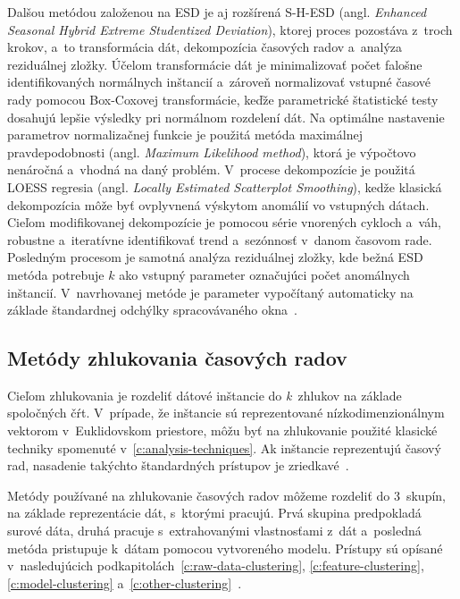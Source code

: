 \documentclass[a4paper,twoside,slovak,12pt,appendix]{article}
\begin{document}
\noindent
Dalšou metódou založenou na ESD je aj rozšírená S-H-ESD (angl. \textit{Enhanced
Seasonal Hybrid Extreme Studentized Deviation}), ktorej proces pozostáva z~troch
krokov, a~to transformácia dát, dekompozícia časových radov a~analýza
reziduálnej zložky. Účelom transformácie dát je minimalizovať počet falošne
identifikovaných normálnych inštancií a~zároveň normalizovať vstupné časové
rady pomocou Box-Coxovej transformácie, keďže parametrické štatistické testy
dosahujú lepšie výsledky pri normálnom rozdelení dát. Na optimálne nastavenie
parametrov normalizačnej funkcie je použitá metóda maximálnej pravdepodobnosti
(angl. \textit{Maximum Likelihood method}), ktorá je výpočtovo nenáročná
a~vhodná na daný problém. V~procese dekompozície je použitá LOESS regresia
(angl. \textit{Locally Estimated Scatterplot Smoothing}), kedže klasická
dekompozícia môže byť ovplyvnená výskytom anomálií vo vstupných dátach.
Cieľom modifikovanej dekompozície je pomocou série vnorených cykloch a~váh,
robustne a~iteratívne identifikovať trend a~sezónnosť v~danom časovom rade.
Posledným procesom je samotná analýza reziduálnej zložky, kde bežná ESD metóda
potrebuje $k$ ako vstupný parameter označujúci počet anomálnych inštancií.
V~navrhovanej metóde je parameter vypočítaný automaticky na základe štandardnej
odchýlky spracovávaného okna~\cite{Vieira2018}.


\subsection{Metódy zhlukovania časových radov}
Cieľom zhlukovania je rozdeliť dátové inštancie do \textit{k}~zhlukov na základe
spoločných čŕt. V~prípade, že inštancie sú reprezentované nízkodimenzionálnym
vektorom v~Euklidovskom priestore, môžu byť na zhlukovanie použité klasické
techniky spomenuté v~\ref{c:analysis-techniques}. Ak inštancie reprezentujú
časový rad, nasadenie takýchto štandardných prístupov je
zriedkavé~\cite{Hautamaki2008}.

Metódy používané na zhlukovanie časových radov môžeme rozdeliť do 3~skupín, na
základe reprezentácie dát, s~ktorými pracujú. Prvá skupina predpokladá surové
dáta, druhá pracuje s~extrahovanými vlastnosťami z~dát a~posledná metóda
pristupuje k~dátam pomocou vytvoreného modelu. Prístupy sú opísané
v~nasledujúcich podkapitolách~\ref{c:raw-data-clustering},
\ref{c:feature-clustering}, \ref{c:model-clustering}
a~\ref{c:other-clustering}~\cite{Rani2012}.
\end{document}
